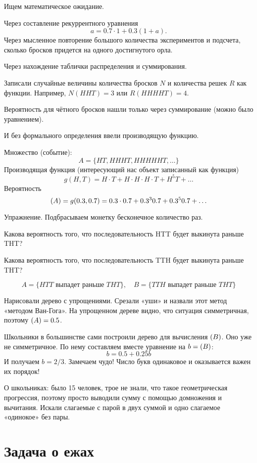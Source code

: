 \documentclass[12pt]{article}
\let\P\relax
\DeclareMathOperator{\P}{\mathbb{P}}
\theoremstyle{definition}
\begin{document}
Ищем математическое ожидание. 

Через составление рекуррентного уравнения
\[
a = 0.7 \cdot 1 + 0.3 (1 + a).
\]
Через мысленное повторение большого количества экспериментов и подсчета, сколько бросков придется на одного достигнутого орла. 

Через нахождение таблички распределения и суммирования. 

Записали случайные величины количества бросков $N$ и количества решек $R$ как функции. 
Например, $N(HHT) = 3$ или $R(HHHHT)= 4$.

Вероятность для чётного бросков нашли только через суммирование (можно было уравнением).

И без формального определения ввели производящую функцию. 

Множество (событие):
\[
A = \{HT, HHHT, HHHHHT, \ldots\}
\]
Производящая функция (интересующий нас объект записанный как функция)
\[
g(H, T) = H\cdot T + H\cdot H\cdot H\cdot T + H^5T + \ldots  
\]
Вероятность
\[
\P(A) = g(0.3, 0.7) = 0.3 \cdot 0.7 + 0.3^3 0.7 + 0.3^5 0.7 + \ldots  
\]


Упражнение. Подбрасываем монетку бесконечное количество раз. 

Какова вероятность того, что последовательность HTT будет выкинута раньше THT?

Какова вероятность того, что последовательность TTH будет выкинута раньше THT?

\[
A = \{HTT \text{ выпадет раньше } THT\}, \quad  B = \{TTH \text{ выпадет раньше } THT\}
\]

Нарисовали дерево с упрощениями. Срезали «уши» и назвали этот метод «методом Ван-Гога».
На упрощенном дереве видно, что ситуация симметричная, поэтому $\P(A) = 0.5$.

Школьники в большинстве сами построили дерево для вычисления $\P(B)$. Оно уже не симметричное.
По нему составляем вместе уравнение на $b=\P(B)$:
\[
b = 0.5 + 0.25b  
\]
И получаем $b=2/3$. Замечаем чудо! Число букв одинаковое и оказывается важен их порядок!


О школьниках: было 15 человек, трое не знали, что такое геометрическая прогрессия, 
поэтому просто выводили сумму с помощью домножения и вычитания. 
Искали слагаемые с парой в двух суммой и одно слагаемое «одинокое» без пары. 

\section{Задача о ежах}
\end{document}
